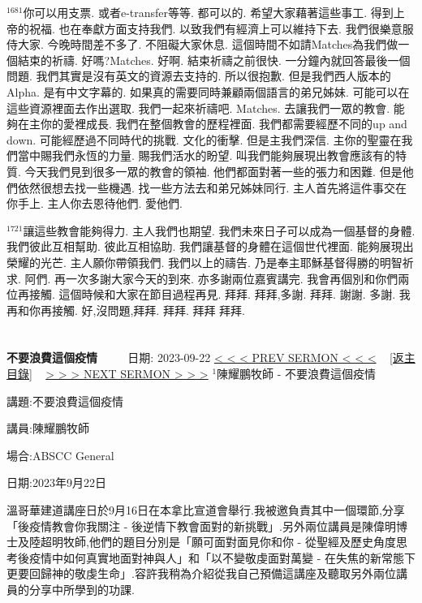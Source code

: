 \documentclass{book}
\begin{document}
$^{1681}$你可以用支票.
或者e-transfer等等.
都可以的.
希望大家藉著這些事工.
得到上帝的祝福.
也在奉獻方面支持我們.
以致我們有經濟上可以維持下去.
我們很樂意服侍大家.
今晚時間差不多了.
不阻礙大家休息.
這個時間不如請Matches為我們做一個結束的祈禱.
好嗎?Matches.
好啊.
結束祈禱之前很快.
一分鐘內就回答最後一個問題.
我們其實是沒有英文的資源去支持的.
所以很抱歉.
但是我們西人版本的Alpha.
是有中文字幕的.
如果真的需要同時兼顧兩個語言的弟兄姊妹.
可能可以在這些資源裡面去作出選取.
我們一起來祈禱吧.
Matches.
去讓我們一眾的教會.
能夠在主你的愛裡成長.
我們在整個教會的歷程裡面.
我們都需要經歷不同的up and down.
可能經歷過不同時代的挑戰.
文化的衝擊.
但是主我們深信.
主你的聖靈在我們當中賜我們永恆的力量.
賜我們活水的盼望.
叫我們能夠展現出教會應該有的特質.
今天我們見到很多一眾的教會的領袖.
他們都面對著一些的張力和困難.
但是他們依然很想去找一些機遇.
找一些方法去和弟兄姊妹同行.
主人首先將這件事交在你手上.
主人你去恩待他們.
愛他們.

$^{1721}$讓這些教會能夠得力.
主人我們也期望.
我們未來日子可以成為一個基督的身體.
我們彼此互相幫助.
彼此互相協助.
我們讓基督的身體在這個世代裡面.
能夠展現出榮耀的光芒.
主人願你帶領我們.
我們以上的禱告.
乃是奉主耶穌基督得勝的明智祈求.
阿們.
再一次多謝大家今天的到來.
亦多謝兩位嘉賓講完.
我會再個別和你們兩位再接觸.
這個時候和大家在節目過程再見.
拜拜.
拜拜,多謝.
拜拜.
謝謝.
多謝.
我再和你再接觸.
好,沒問題,拜拜.
拜拜.
拜拜 拜拜.
\newpage



\section{}
\label{sec:6}
\textbf{不要浪費這個疫情}
\newline
\newline
~~~~ 日期: 2023-09-22
\newline
\newline
\hyperref[sec:B5n__dtTRhE]{\small{< < < PREV SERMON < < <}}
~
\hyperref[sec:index]{\small{[返主目錄]}}
~
\hyperref[sec:7]{\small{> > > NEXT SERMON > > >}}
\newline
\newline
$^{1}$陳耀鵬牧師 - 不要浪費這個疫情

講題:不要浪費這個疫情

講員:陳耀鵬牧師

場合:ABSCC General

日期:2023年9月22日

溫哥華建道講座日於9月16日在本拿比宣道會舉行.我被邀負責其中一個環節,分享「後疫情教會你我關注 - 後逆情下教會面對的新挑戰」.另外兩位講員是陳偉明博士及陸超明牧師,他們的題目分別是「願可面對面見你和你 - 從聖經及歷史角度思考後疫情中如何真實地面對神與人」和「以不變敬虔面對萬變 - 在失焦的新常態下更要回歸神的敬虔生命」.容許我稍為介紹從我自己預備這講座及聽取另外兩位講員的分享中所學到的功課.
\end{document}

